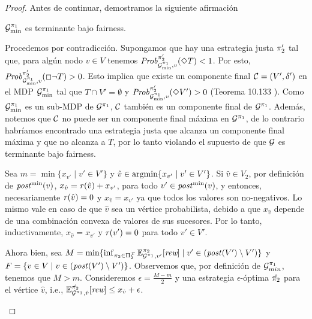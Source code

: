 \begin{proof}
  Antes de continuar, demostramos la siguiente afirmación
  \begin{claim}
    $\mathcal{G}^{\pi_{1}}_{\min}$ es terminante bajo fairness.
  \end{claim}
  \begin{proofofclaim}
    Procedemos por contradicción. Supongamos que hay una estrategia justa $\pi_{2}'$ tal que, para algún nodo $v \in V$ tenemos
    $\mathit{Prob}^{\pi_{2}'}_{\mathcal{G}_{\min}^{\pi_{1}},v}(\Diamond T) < 1$.
    Por esto,  $\mathit{Prob}^{\pi_{2}'}_{\mathcal{G}_{\min}^{\pi_{1}},v}(\Box \neg T) > 0$.
    Esto implica que existe un componente final $\mathcal{C} = (V',
    \delta')$ en el MDP $\mathcal{G}_{\min}^{\pi_{1}}$ tal que
    $T \cap V' = \emptyset$ y
    $\mathit{Prob}^{\pi_{2}'}_{\mathcal{G}_{\min}^{\pi_{1}},v}(\Diamond V') > 0$
    (Teorema 10.133 \cite[p.~889]{BaierK08}).
    Como $\mathcal{G}_{\min}^{\pi_{1}}$ es un sub-MDP de
    $\mathcal{G}^{\pi_{1}}$, $\mathcal{C}$ también es un componente final de
    $\mathcal{G}^{\pi_{1}}$.
    Además, notemos que $\mathcal{C}$ no puede ser un componente final máxima en
    $\mathcal{G}^{\pi_{1}}$, de lo contrario habríamos encontrado una estrategia justa que alcanza un componente final máxima y que no alcanza a $T$, por lo tanto
    violando el supuesto de que $\mathcal{G}$ es terminante bajo
    fairness.
    
    Sea $m = \min \{ x_{v'} \mid v' \in V' \}$ y
    $\hat{v} \in \operatorname*{argmin}  \{ x_{v'}  \mid v' \in V' \}$.
    Si $\hat{v}\in V_2$, por definición de $\mathit{post}^{\min}(v)$,
    $x_{\hat{v}} = \mathit{r}(\hat{v}) + x_{v'}$, para todo
    $v' \in \mathit{post}^{\min}(v)$, y entonces, necesariamente $\mathit{r}(\hat{v})=0$
    y $x_{\hat{v}} = x_{v'}$ ya que todos los valores son no-negativos.
    Lo mismo vale en caso de que $\hat{v}$ sea un vértice probabilista,
    debido a que $x_{\hat{v}}$ depende de una combinación convexa de valores de sus sucesores.
    Por lo tanto, inductivamente, $x_{\hat{v}} = x_{v'}$ y $\mathit{r}(v')=0$ para
    todo $v'\in V'$.

    Ahora bien, sea
    $M =  \min \{ \inf_{\pi_{2} \in \Pi^{\mathcal{F}}_{2}}  \mathbb{E}^{\pi_{2}}_{\mathcal{G}^{\pi_{1}},v'}[\textit{rew}] \mid v' \in (\mathit{post}(V') \setminus V')\}$
    y 
    $F=\{v \in V \mid v \in (\mathit{post}(V') \setminus V')\}$.
    Observemos que, por definición de $\mathcal{G}_{min}^{\pi_{1}}$, tenemos que $M > m$.
    Consideremos $\epsilon = \frac{M -m}{2}$ y una estrategia $\epsilon$-óptima
    $\hat{\pi_{2}}$ para el vértice $\hat{v}$, i.e.,
    $\mathbb{E}^{\hat{\pi_{2}}}_{\mathcal{G}^{\pi_{1}},\hat{v}}[\textit{rew}] \leq x_{\hat{v}} + \epsilon$.
    

\end{proofofclaim}
\end{proof}
